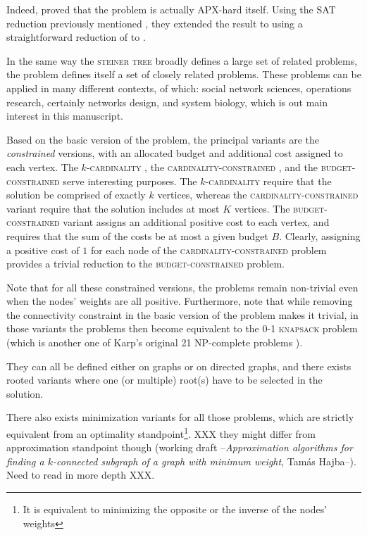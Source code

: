 	Indeed, \textcite{alvarez2013maximum} proved that the \mwcs{} problem is actually APX-hard itself.
	Using the SAT reduction previously mentioned \parencite{feigenbaum2000sharing}, they extended the result to \mwcs{} using a straightforward reduction of \pcst{} to \mwcs{}.

	In the same way the \textsc{steiner tree} broadly defines a large set of related problems, the \mwcs{} problem defines itself a set of closely related problems.
	These problems can be applied in many different contexts, of which: social network sciences, operations research, certainly networks design, and system biology, which is out main interest in this manuscript.

	Based on the basic version of the \mwcs{} problem, the principal variants are the \emph{constrained} versions, with an allocated budget and additional cost assigned to each vertex.
	The \textsc{$k$-cardinality \mwcs{}}, the \textsc{cardinality-constrained \mwcs{}}, and the \textsc{budget-constrained \mwcs{}} serve interesting purposes.
	The \textsc{$k$-cardinality \mwcs{}} require that the solution be comprised of exactly $k$ vertices, whereas the \textsc{cardinality-constrained \mwcs{}} variant require that the solution includes at most $K$ vertices.
	The \textsc{budget-constrained \mwcs{}} variant assigns an additional positive cost to each vertex, and requires that the sum of the costs be at most a given budget $B$.
	Clearly, assigning a positive cost of $1$ for each node of the \textsc{cardinality-constrained \mwcs{}} problem provides a trivial reduction to the \textsc{budget-constrained \mwcs{}} problem.

	Note that for all these constrained versions, the problems remain non-trivial even when the nodes' weights are all positive.
	Furthermore, note that while removing the connectivity constraint in the basic version of the problem makes it trivial, in those variants the problems then become equivalent to the \textsc{0-1 knapsack} problem (which is another one of Karp's original 21 NP-complete problems \parencite{karp1972reducibility}).

	They can all be defined either on graphs or on directed graphs, and there exists rooted variants where one (or multiple) root(s) have to be selected in the solution.

	There also exists minimization variants for all those problems, which are strictly equivalent from an optimality standpoint\footnote{It is equivalent to minimizing the opposite or the inverse of the nodes' weights}.
	XXX they might differ from approximation standpoint though (working draft --\emph{Approximation algorithms for finding a $k$-connected subgraph of a graph with minimum weight}, Tam\'{a}s Hajba--). Need to read in more depth XXX.


